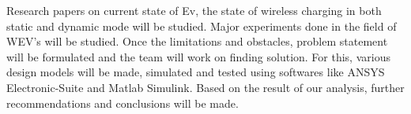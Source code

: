 Research papers on current state of Ev, the state of wireless charging in both static and dynamic mode will be studied. Major experiments done in the field of WEV's will be studied. Once the limitations and obstacles, problem statement will be formulated and the team will work on finding solution. For this, various design models will be made, simulated and tested using softwares like ANSYS Electronic-Suite and Matlab Simulink. Based on the result of our analysis, further recommendations and conclusions will be made. 
